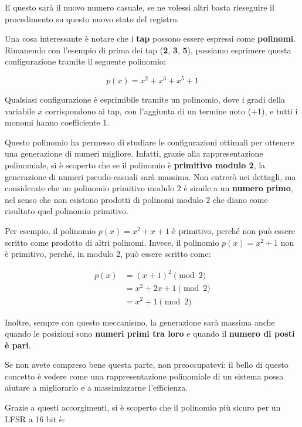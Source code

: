\documentclass{report}
\begin{document}
E questo sarà il nuovo numero casuale, se ne volessi altri basta rieseguire il procedimento su questo nuovo stato del registro.

\newpage

Una cosa interessante è notare che i \textbf{tap} possono essere espressi come \textbf{polinomi}.  
Rimanendo con l'esempio di prima dei tap (\textbf{2}, \textbf{3}, \textbf{5}), possiamo esprimere questa configurazione tramite il seguente polinomio:


\begin{equation*}
    p(x) = x^2 + x^3 + x^5 +1
\end{equation*}

Qualsiasi configurazione è esprimibile tramite un polinomio, dove i gradi della variabile $x$ corrispondono ai tap, con l'aggiunta di un termine noto ($+1$), e tutti i monomi hanno coefficiente 1.


Questo polinomio ha permesso di studiare le configurazioni ottimali per ottenere una generazione di numeri migliore.  
Infatti, grazie alla rappresentazione polinomiale, si è scoperto che se il polinomio è \textbf{primitivo modulo 2}, la generazione di numeri pseudo-casuali sarà massima.  
Non entrerò nei dettagli, ma considerate che un polinomio primitivo modulo 2 è simile a un \textbf{numero primo}, nel senso che non esistono prodotti di polinomi modulo 2 che diano come risultato quel polinomio primitivo.


Per esempio, il polinomio $p(x) = x^2 + x + 1$ è primitivo, perché non può essere scritto come prodotto di altri polinomi.  
Invece, il polinomio $p(x) = x^2 + 1$ non è primitivo, perché, in modulo 2, può essere scritto come:


\begin{align*}
    p(x) &= (x+1)^2 \pmod{2} \\ 
         &= x^2 + 2x +1 \pmod{2} \\
         &= x^2 +1 \pmod{2}
\end{align*}

Inoltre, sempre con questo meccanismo, la generazione sarà massima anche quando le posizioni sono \textbf{numeri primi tra loro} e quando il \textbf{numero di posti è pari}.


Se non avete compreso bene questa parte, non preoccupatevi: il bello di questo concetto è vedere come una rappresentazione polinomiale di un sistema possa aiutare a migliorarlo e a massimizzarne l'efficienza.


Grazie a questi accorgimenti, si è scoperto che il polinomio più sicuro per un LFSR a 16 bit è:
\end{document}
